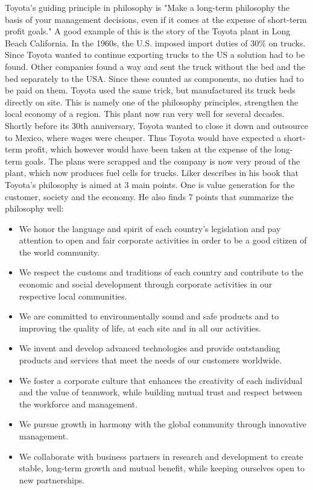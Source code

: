\documentclass[a4paper,12pt]{scrartcl}
\begin{document}
Toyota's guiding principle in philosophy is "Make a long-term philosophy the basis of your management decisions, even if it comes at the expense of short-term profit goals." A good example of this is the story of the Toyota plant in Long Beach California. In the 1960s, the U.S. imposed import duties of 30\% on trucks. Since Toyota wanted to continue exporting trucks to the US a solution had to be found. Other companies found a way and sent the truck without the bed and the bed separately to the USA. Since these counted as components, no duties had to be paid on them. Toyota used the same trick, but manufactured its truck beds directly on site. This is namely one of the philosophy principles, strengthen the local economy of a region. This plant now ran very well for several decades. Shortly before its 30th anniversary, Toyota wanted to close it down and outsource to Mexico, where wages were cheaper. Thus Toyota would have expected a short-term profit, which however would have been taken at the expense of the long-term goals. The plans were scrapped and the company is now very proud of the plant, which now produces fuel cells for trucks.
Liker describes in his book that Toyota's philosophy is aimed at 3 main points. One is value generation for the customer, society and the economy. He also finds 7 points that summarize the philosophy well:


\begin{itemize}
    \item We honor the language and spirit of each country's legislation and pay attention to open and fair corporate activities in order to be a good citizen of the world community.
    \item We respect the customs and traditions of each country and contribute to the economic and social development through corporate activities in our respective local communities.
    \item We are committed to environmentally sound and safe products and to improving the quality of life, at each site and in all our activities.
    \item We invent and develop advanced technologies and provide outstanding products and services that meet the needs of our customers worldwide.
    \item We foster a corporate culture that enhances the creativity of each individual and the value of teamwork, while building mutual trust and respect between the workforce and management.
    \item We pursue growth in harmony with the global community through innovative management.
    \item We collaborate with business partners in research and development to create stable, long-term growth and mutual benefit, while keeping ourselves open to new partnerships.
\end{itemize}
\end{document}
